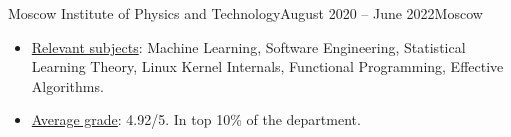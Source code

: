 {Moscow Institute of Physics and Technology}{August 2020 -- June 2022}{Moscow}
\begin{itemize}
    \item \underline{Relevant subjects}: Machine Learning, Software Engineering, Statistical Learning Theory, Linux Kernel Internals, Functional Programming, Effective Algorithms.

    \item \underline{Average grade}: 4.92/5. In top 10\% of the department.
\end{itemize}
